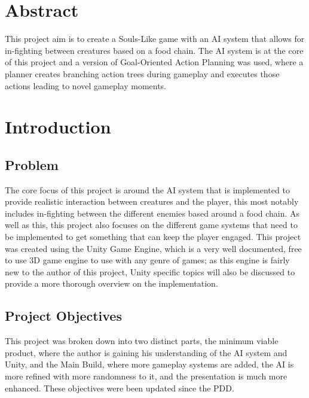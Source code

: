 \documentclass[11pt]{report}
\begin{document}


\tableofcontents

\chapter{Abstract}
This project aim is to create a Souls-Like game with an AI system that allows for in-fighting between creatures based on a food chain. The AI system is at the core of this project and a version of Goal-Oriented Action Planning was used, where a planner creates branching action trees during gameplay and executes those actions leading to novel gameplay moments.

\chapter{Introduction}
\section{Problem}
The core focus of this project is around the AI system that is implemented to provide realistic interaction between creatures and the player, this most notably includes in-fighting between the different enemies based around a food chain. As well as this, this project also focuses on the different game systems that need to be implemented to get something that can keep the player engaged. This project was created using the Unity Game Engine, which is a very well documented, free to use 3D game engine to use with any genre of games; as this engine is fairly new to the author of this project, Unity specific topics will also be discussed to provide a more thorough overview on the implementation.

\section{Project Objectives}
This project was broken down into two distinct parts, the minimum viable product, where the author is gaining his understanding of the AI system and Unity, and the Main Build, where more gameplay systems are added, the AI is more refined with more randomness to it, and the presentation is much more enhanced. These objectives were been updated since the PDD.
\end{document}

